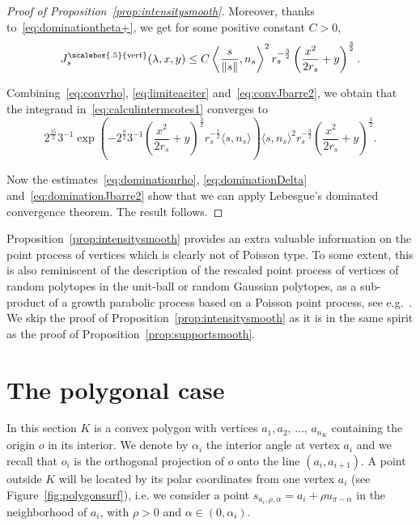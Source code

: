 \documentclass[AHL,Unicode,longabstracts,published]{cedram}
\DeclareMathOperator{\Vertt}{\scalebox{.5}{vert}}
\newcommand{\pass}{\vspace{0.3cm}\noindent}
\newcommand{\noi}{\noindent}
\begin{document}
\begin{proof}[{{Proof of Proposition~\ref{prop:intensitysmooth}}}]
Moreover, thanks to~\eqref{eq:dominationtheta+}, we get for some positive constant $C>0$,
\begin{equation}\label{eq:dominationJbarre2}
J^{\Vertt}_{s}(\lambda,x,y)\le C \left\langle \frac{s}{\|s\|},n_s\right\rangle^2r_s^{-\frac{3}{2}}\left(\frac{x^2}{2r_s}+y\right)^{\frac{3}{2}}.
\end{equation}

Combining~\eqref{eq:convrho}, \eqref{eq:limiteaciter} and~\eqref{eq:convJbarre2}, we obtain that the integrand in~\eqref{eq:calculintermcotes1} converges to
\[
2^{\frac{15}{2}}3^{-1}\exp\left(-2^{\frac{9}{2}}3^{-1} \left(\frac{x^2}{2r_s}+y\right)^{\frac{3}{2}} r_{s}^{-\frac1{2}}\langle s,n_s\rangle\right)
\langle s,n_s\rangle^2r_s^{-\frac{3}{2}}\left(\frac{x^2}{2r_s}+y\right)^{\frac{3}{2}}.
\]

Now the estimates~\eqref{eq:dominationrho}, \eqref{eq:dominationDelta} and~\eqref{eq:dominationJbarre2} show that we can apply Lebesgue's dominated convergence theorem. The result follows.
\end{proof}

Proposition~\ref{prop:intensitysmooth} provides an extra valuable information on the point process of vertices which is clearly not of Poisson type. To some extent, this is also reminiscent of the description of the rescaled point process of vertices of random polytopes in the unit-ball or random Gaussian polytopes, as a sub-product of a growth parabolic process based on a Poisson point process, see e.g.~\cite[Theorem~4.1]{CSY}. We skip the proof of Proposition~\ref{prop:intensitysmooth} as it is in the same spirit as the proof of Proposition~\ref{prop:supportsmooth}.



\section{The polygonal case}\label{sec:polygon}

In this section $K$ is a convex polygon with vertices $a_1,a_2,\,\ldots,\,a_{n_K}$ containing the origin $o$ in its interior. We denote by $\alpha_i$ the interior angle at vertex $a_i$ and we recall that $o_i$ is the orthogonal projection of $o$ onto the line $(a_i,a_{i+1})$. A point outside $K$ will be located by its polar coordinates from one vertex $a_i$ (see Figure~\ref{fig:polygonsurf}), i.e. we consider a point $s_{a_i,\rho,\alpha}=a_i+\rho u_{\pi-\alpha}$ in the neighborhood of $a_i$, with $\rho>0$ and $\alpha\in(0,\alpha_i)$.
\end{document}
